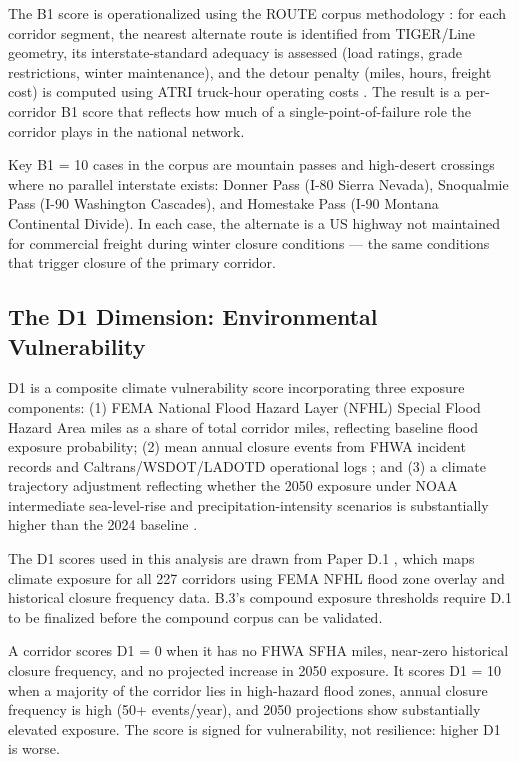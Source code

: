 The B1 score is operationalized using the ROUTE corpus methodology \citep{ROUTE_B1}: for each corridor segment, the nearest alternate route is identified from TIGER/Line geometry, its interstate-standard adequacy is assessed (load ratings, grade restrictions, winter maintenance), and the detour penalty (miles, hours, freight cost) is computed using ATRI truck-hour operating costs \citep{ATRI_costs2024}. The result is a per-corridor B1 score that reflects how much of a single-point-of-failure role the corridor plays in the national network.

Key B1 = 10 cases in the corpus are mountain passes and high-desert crossings where no parallel interstate exists: Donner Pass (I-80 Sierra Nevada), Snoqualmie Pass (I-90 Washington Cascades), and Homestake Pass (I-90 Montana Continental Divide). In each case, the alternate is a US highway not maintained for commercial freight during winter closure conditions --- the same conditions that trigger closure of the primary corridor.

\subsection{The D1 Dimension: Environmental Vulnerability}

D1 is a composite climate vulnerability score incorporating three exposure components: (1) FEMA National Flood Hazard Layer (NFHL) Special Flood Hazard Area miles as a share of total corridor miles, reflecting baseline flood exposure probability; (2) mean annual closure events from FHWA incident records and Caltrans/WSDOT/LADOTD operational logs \citep{Caltrans2023, FHWA_freight2023}; and (3) a climate trajectory adjustment reflecting whether the 2050 exposure under NOAA intermediate sea-level-rise and precipitation-intensity scenarios is substantially higher than the 2024 baseline \citep{FEMA_NFHL} \citep{ROUTE_D1}.

The D1 scores used in this analysis are drawn from Paper D.1 \citep{ROUTE_D1}, which maps climate exposure for all 227 corridors using FEMA NFHL flood zone overlay and historical closure frequency data. B.3's compound exposure thresholds require D.1 to be finalized before the compound corpus can be validated.

A corridor scores D1 = 0 when it has no FHWA SFHA miles, near-zero historical closure frequency, and no projected increase in 2050 exposure. It scores D1 = 10 when a majority of the corridor lies in high-hazard flood zones, annual closure frequency is high (50+ events/year), and 2050 projections show substantially elevated exposure. The score is signed for vulnerability, not resilience: higher D1 is worse.

